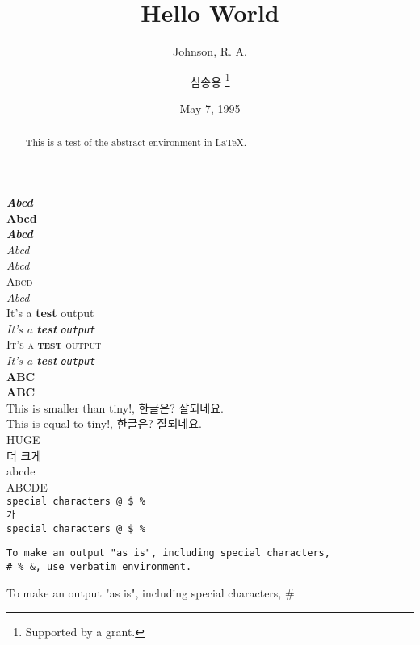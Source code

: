 \documentclass[11pt]{article}
\title{Hello World}
\author{Johnson, R. A. \and 심송용 \thanks{Supported by a grant.}}
\date{May 7, 1995}
\begin{document}
\maketitle

\begin{abstract}
This is a test of the abstract environment in \LaTeX.
\end{abstract}

{\bfseries\rmfamily\itshape Abcd} \\
{\bfseries\ttfamily\upshape Abcd} \\
{\bfseries\rmfamily\slshape Abcd} \\
{\mdseries\rmfamily\itshape Abcd} \\
{\mdseries\ttfamily\itshape Abcd} \\
{\mdseries\sffamily\scshape Abcd} \\
{\mdseries\sffamily\slshape Abcd} \\

\textup{It's a \textbf{test} \textrm{output}} \\
\textit{It's a \textbf{test} \texttt{output}} \\
\textsc{It's a \textbf{test} \textsf{output}} \\
\textsl{It's a \textbf{test} \texttt{output}}  \\
{\Large\bf ABC} \\
{\bf\Large ABC} \\
{\fontsize{2.5pt}{5pt}\selectfont This is smaller than tiny!, 한글은? 잘되네요.} \\
{\tiny This is equal to tiny!, 한글은? 잘되네요.} \\
{\fontsize{3.3cm}{3.8cm}\selectfont HUGE \\ 더 크게} \\

\lowercase{AbCdE} \\
\uppercase{AbCdE}  \\

\verb|special characters @ $ %| \\
\verb|가| \\

\verb*|special characters @ $ %| \\

\begin{verbatim}
To make an output "as is", including special characters,
# % &, use verbatim environment.
\end{verbatim}

\begin{verbatim*}
To make an output "as is", including special characters,
# % &, use verbatim environment.
\end{verbatim*}
\end{document}
